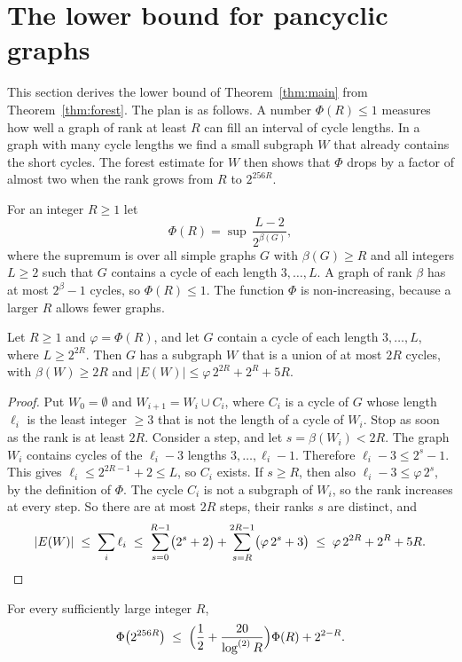 \section{The lower bound for pancyclic graphs}\label{sec:lower}

This section derives the lower bound of Theorem~\ref{thm:main} from Theorem~\ref{thm:forest}. The
plan is as follows. A number $\Phi(R)\le1$ measures how well a graph of rank at least $R$ can fill
an interval of cycle lengths. In a graph with many cycle lengths we find a small subgraph $W$ that
already contains the short cycles. The forest estimate for $W$ then shows that $\Phi$ drops by a
factor of almost two when the rank grows from $R$ to $2^{256R}$.

For an integer $R\ge1$ let
\[
  \Phi(R)=\sup\,\frac{L-2}{2^{\beta(G)}} ,
\]
where the supremum is over all simple graphs $G$ with $\beta(G)\ge R$ and all integers $L\ge2$ such
that $G$ contains a cycle of each length $3,\dots,L$. A graph of rank $\beta$ has at most
$2^{\beta}-1$ cycles, so $\Phi(R)\le1$. The function $\Phi$ is non-increasing, because a larger $R$
allows fewer graphs.

\begin{lemma}[Witness]\label{lem:witness}
Let $R\ge1$ and $\varphi=\Phi(R)$, and let $G$ contain a cycle of each length $3,\dots,L$, where
$L\ge2^{2R}$. Then $G$ has a subgraph $W$ that is a union of at most $2R$ cycles, with
$\beta(W)\ge2R$ and $|E(W)|\le\varphi\,2^{2R}+2^{R}+5R$.
\end{lemma}

\begin{proof}
Put $W_0=\emptyset$ and $W_{i+1}=W_i\cup C_i$, where $C_i$ is a cycle of $G$ whose length $\ell_i$ is
the least integer $\ge3$ that is not the length of a cycle of $W_i$. Stop as soon as the rank is at
least $2R$. Consider a step, and let $s=\beta(W_i)<2R$. The graph $W_i$ contains cycles of the
$\ell_i-3$ lengths $3,\dots,\ell_i-1$. Therefore $\ell_i-3\le2^{s}-1$. This gives
$\ell_i\le2^{2R-1}+2\le L$, so $C_i$ exists. If $s\ge R$, then also $\ell_i-3\le\varphi\,2^{s}$, by
the definition of $\Phi$. The cycle $C_i$ is not a subgraph of $W_i$, so the rank increases at every
step. So there are at most $2R$ steps, their ranks $s$ are distinct, and
\[
  |E(W)|\;\le\;\sum_i\ell_i\;\le\;\sum_{s=0}^{R-1}\bigl(2^{s}+2\bigr)+\sum_{s=R}^{2R-1}\bigl(\varphi\,2^{s}+3\bigr)
  \;\le\;\varphi\,2^{2R}+2^{R}+5R .\qedhere
\]
\end{proof}

\begin{proposition}\label{prop:halving}
For every sufficiently large integer $R$,
\[
  \Phi\bigl(2^{256R}\bigr)\;\le\;\Bigl(\frac12+\frac{20}{\log^{(2)}R}\Bigr)\Phi(R)+2^{2-R}.
\]
\end{proposition}

